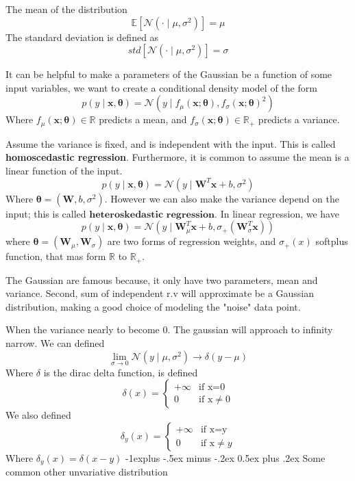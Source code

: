 \documentclass[10pt,landscape]{article}
\makeatletter
\newcommand{\N}{\mathcal{N}}
\newcommand{\mean}{\mathbb{E}}
\newcommand{\inp}{\textbf{x}}
\newcommand{\parameter}{\boldsymbol{\theta}}
\newcommand{\R}{\mathbb{R}}
\newcommand{\variance}{\sigma^2}
\newcommand{\normal}{\mathcal{N}}
\newcommand{\weight}{\mathbf{W}}
\newcommand{\softplus}[1]{\sigma_+(#1)}
\renewcommand{\subsection}{\@startsection{subsection}{2}{0mm}%
                                {-1explus -.5ex minus -.2ex}%
                                {0.5ex plus .2ex}%
                                {\normalfont\normalsize\bfseries}}
\makeatother
\begin{document}
\begin{multicols*}{3}
The mean of the distribution
\[\mean[\normal(\cdot\mid\mu,\variance)]=\mu\]
The standard deviation is defined as
\[std[\normal(\cdot\mid\mu,\variance)]=\sigma\]

It can be helpful to make a parameters of the Gaussian be a function of some input variables, we want to create a conditional density model of the form
\[
    p(y\mid\inp,\parameter)=\normal(y\mid f_{\mu}(\inp;\parameter),f_{\sigma}(\inp;\parameter)^2)
\]
Where $f_{\mu}(\inp;\parameter)\in\R$ predicts a mean, and $f_{\sigma}(\inp;\parameter)\in\R_+$ predicts a variance.

Assume the variance is fixed, and is independent with the input. This is called \textbf{homoscedastic regression}. Furthermore, it is common to assume the mean is a linear function of the input.
\[
    p(y\mid\inp,\parameter)=\normal(y\mid \weight^T\inp+b,\variance)
\]
Where $\parameter=(\weight,b,\variance)$. However we can also make the variance depend on the input; this is called $\textbf{heteroskedastic regression}$. In linear regression, we have
\[
    p(y\mid\inp,\parameter)=\normal(y\mid \weight_{\mu}^T\inp+b,\sigma_+(\weight_\sigma^T\inp))
\]
where $\parameter=(\weight_{\mu},\weight_\sigma)$ are two forms of regression weights, and $\softplus{x}$ softplus function, that mas form $\R$ to $\R_+$.

The Gaussian are famous because, it only have two parameters, mean and variance. Second, sum of independent r.v will approximate be a Gaussian distribution, making a good choice of modeling the "noise" data point.

When the variance nearly to become 0. The gaussian will  approach to infinity narrow. We can defined
\[
\lim_{\sigma\rightarrow0}\N(y\mid\mu,\variance)\rightarrow\delta(y-\mu)
\]
Where $\delta$ is the dirac delta function, is defined
\[
    \delta(x) = 
    \begin{cases}
        +\infty & \text{if x=0} \\
        0  & \text{if x}  \neq 0
    \end{cases}
\]
We also defined
\[
    \delta_y(x) = 
    \begin{cases}
        +\infty & \text{if x=y} \\
        0  & \text{if x}  \neq y
    \end{cases}
\]
Where $\delta_y(x) = \delta(x-y)$
\subsection{Some common other unvariative distribution}


\end{multicols*}
\end{document}

